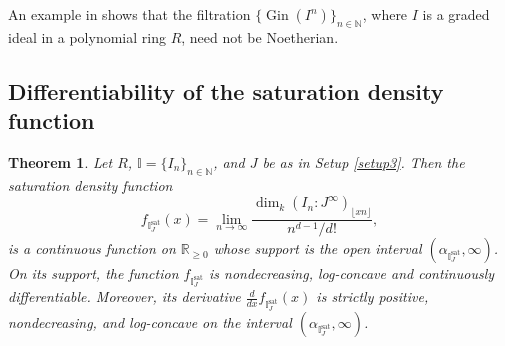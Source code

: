 \documentclass[12pt,a4paper]{amsart}
\theoremstyle{plain}
\newtheorem{theorem}{Theorem}[section]
\theoremstyle{definition}
\numberwithin{equation}{theorem}
\begin{document}
An example in \cite[Section 3]{HHT02} shows that the filtration $\{\operatorname{Gin}(I^n)\}_{n\in\mathbb{N}}$, where $I$ is a graded ideal in a polynomial ring $R$, need not be Noetherian.

\subsection{Differentiability of the saturation density function}

\begin{theorem}\label{saturated_density_diff}
Let $R$, $\mathbb{I}=\{I_n\}_{n\in\mathbb{N}}$, and $J$ be as in Setup \ref{setup3}. Then the saturation density function $$f_{\mathbb{I}^{\mathrm{sat}}_J}(x) = \lim_{n\to\infty}\dfrac{\dim_k {\left(I_n \colon J^{\infty}\right)}_{\lfloor xn \rfloor}}{n^{d-1}/d!},$$ is a continuous function on $\mathbb{R}_{\geq 0}$ whose support is the open interval $(\alpha_{\mathbb{I}^{\mathrm{sat}}_J},\infty)$. On its support, the function $f_{\mathbb{I}^{\mathrm{sat}}_J}$ is nondecreasing, log-concave and continuously differentiable. Moreover, its derivative $\frac{d}{dx}f_{\mathbb{I}^{\mathrm{sat}}_J}(x)$ is strictly positive, nondecreasing, and log-concave on the interval $(\alpha_{\mathbb{I}^{\mathrm{sat}}_J},\infty)$.
\end{theorem}
\end{document}
